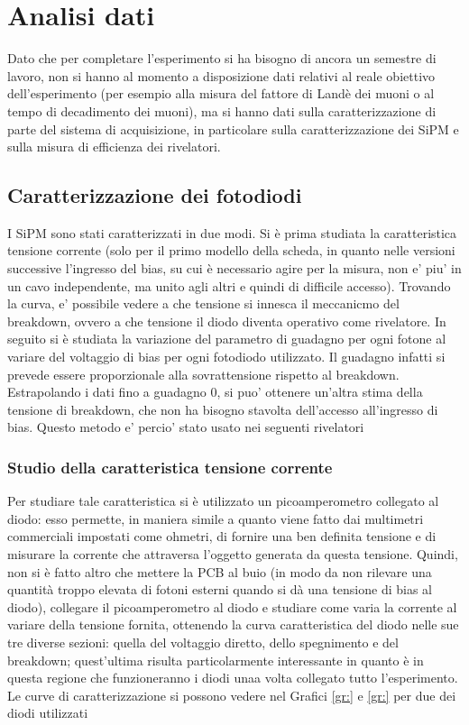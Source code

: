 \section{Analisi dati}
Dato che per completare l'esperimento si ha bisogno di ancora un semestre di lavoro, non si hanno al momento a disposizione dati relativi al reale obiettivo dell'esperimento
(per esempio alla misura del fattore di Landè dei muoni o al tempo di decadimento dei muoni), ma si hanno dati sulla caratterizzazione di parte del sistema di acquisizione,
in particolare sulla caratterizzazione dei SiPM e sulla misura di efficienza dei rivelatori.

\subsection{Caratterizzazione dei fotodiodi}
I SiPM sono stati caratterizzati in due modi. Si è prima studiata la caratteristica tensione corrente (solo per il primo modello della scheda, in quanto nelle versioni successive l'ingresso del bias, su cui \`e necessario agire per la misura, non e' piu' in un cavo independente, ma unito agli altri e quindi di difficile accesso). Trovando la curva, e' possibile vedere a che tensione si innesca il meccanicmo del breakdown, ovvero a che tensione il diodo diventa operativo come rivelatore.
In seguito si è studiata la variazione del parametro di guadagno per ogni fotone al variare del voltaggio di bias per ogni fotodiodo utilizzato. Il guadagno infatti si prevede essere proporzionale alla sovrattensione rispetto al breakdown. Estrapolando i dati fino a guadagno 0, si puo' ottenere un'altra stima della tensione di breakdown, che non ha bisogno stavolta dell'accesso all'ingresso di bias. Questo metodo e' percio' stato usato nei seguenti rivelatori

\subsubsection{Studio della caratteristica tensione corrente}
Per studiare tale caratteristica si è utilizzato un picoamperometro collegato al diodo: esso permette, in maniera simile a quanto viene fatto dai multimetri commerciali
impostati come ohmetri, di fornire una ben definita tensione e di misurare la corrente che attraversa l'oggetto generata da questa tensione. Quindi,
non si è fatto altro che mettere la PCB al buio (in modo da non rilevare una quantità troppo elevata di fotoni esterni quando si dà una tensione di bias al diodo),
collegare il picoamperometro al diodo e studiare come varia la corrente al variare della tensione fornita, ottenendo la curva caratteristica del diodo nelle sue tre diverse
sezioni: quella del voltaggio diretto, dello spegnimento e del breakdown; quest'ultima risulta particolarmente interessante in quanto è in questa regione che funzioneranno
i diodi unaa volta collegato tutto l'esperimento. Le curve di caratterizzazione si possono vedere nel Grafici \ref{gr:} e \ref{gr:} per due dei diodi utilizzati

